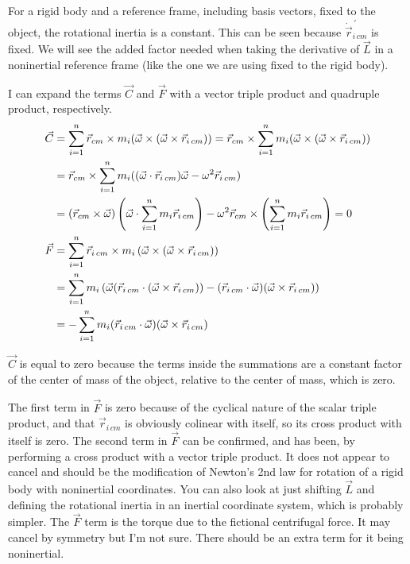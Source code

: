 \documentclass[10pt]{article}
\begin{document}
For a rigid body and a reference frame, including basis vectors, 
fixed to the object, the rotational inertia is a constant. This 
can be seen because $\dot{\vec{r}}^{\,\prime}_{i\,cm}$ is fixed. 
We will see 
the added factor needed when taking the derivative of $\vec{L}$ in 
a noninertial reference frame (like the one we are using fixed to the 
rigid body).

I can expand the terms $\vec{C}$ and $\vec{F}$ with a vector
triple product and quadruple product, respectively.
\begin{align}
   \vec{C} &= \sum_{i=1}^n\vec{r}_{cm}\times m_i 
        (\vec{\omega}\times(\vec{\omega}\times\vec{r}_{i\,cm})) = 
        \vec{r}_{cm}\times \sum_{i=1}^n m_i
        (\vec{\omega}\times(\vec{\omega}\times\vec{r}_{i\,cm})) \notag\\
    &= \vec{r}_{cm}\times \sum_{i=1}^n m_i 
        ((\vec{\omega}\cdot\vec{r}_{i\,cm})\vec{\omega} 
        - \omega^2\vec{r}_{i\,cm}) \notag\\
    &= (\vec{r}_{cm}\times\vec{\omega})
        \left(\vec{\omega}\cdot \sum_{i=1}^n m_i 
        \vec{r}_{i\,cm}\right) - 
        \omega^2\vec{r}_{cm}\times
        \left(\sum_{i=1}^n m_i\vec{r}_{i\,cm}\right) =0 \notag\\
    \vec{F} &= \sum_{i=1}^n\vec{r}_{i\,cm}\times m_i
        \left(\vec{\omega}\times(\vec{\omega}\times\vec{r}_{i\,cm})\right) 
        \notag\\
    &=\sum_{i=1}^n m_i\left(\vec{\omega}(\vec{r}_{i\,cm}\cdot(\vec{\omega}
        \times\vec{r}_{i\,cm})) - 
        (\vec{r}_{i\,cm}\cdot\vec{\omega})(\vec{\omega}\times\vec{r}_{i\,cm})
        \right) \notag\\
    &= -\sum_{i=1}^n m_i
        (\vec{r}_{i\,cm}\cdot\vec{\omega})(\vec{\omega}\times\vec{r}_{i\,cm})
\end{align}

$\vec{C}$ is equal to zero because the terms inside the summations are 
a constant factor of the center of mass of the object, relative to the 
center of mass, which is zero.

The first term in $\vec{F}$ is zero because of the cyclical nature of 
the scalar triple product, and that $\vec{r}_{i\,cm}$ is obviously 
colinear with itself, so its cross product with itself is zero. 
The second term in $\vec{F}$ can be confirmed, and has been, by performing 
a cross product with a vector triple product. 
It does not appear to cancel and should be the 
modification of Newton's 2nd law for rotation of a rigid body with noninertial 
coordinates. You can also look at just shifting $\vec{L}$ and defining 
the rotational inertia in an inertial coordinate system, which is probably 
simpler. The $\vec{F}$ term is the torque due to the fictional 
centrifugal force. It may cancel by symmetry but I'm not sure. There should 
be an extra term for it being noninertial.
\end{document}

